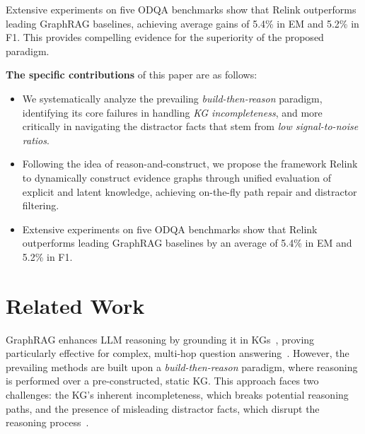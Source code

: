 \documentclass[letterpaper]{article} %
\begin{document}
Extensive experiments on five ODQA benchmarks show that Relink outperforms leading GraphRAG baselines, achieving average gains of 5.4\% in EM and 5.2\% in F1. This provides compelling evidence for the superiority of the proposed paradigm.



\smallskip\noindent
{\bf The specific contributions} of this paper are as follows:
\begin{itemize}
\item[1)] We systematically analyze the prevailing \textit{build-then-reason} paradigm, identifying its core failures in handling \textit{KG incompleteness}, and more critically in navigating the distractor facts that stem from \textit{low signal-to-noise ratios}.
\item[2)] Following the idea of reason-and-construct, we propose the framework Relink to dynamically construct evidence graphs through unified evaluation of explicit and latent knowledge, achieving on-the-fly path repair and distractor filtering.
\item[3)] Extensive experiments on five ODQA benchmarks show that Relink outperforms leading GraphRAG baselines by an average of 5.4\% in EM and 5.2\% in F1.
\end{itemize}

\section{Related Work}

GraphRAG enhances LLM reasoning by grounding it in KGs~\cite{roadmap,graph_review_2,DBLP:conf/www/ZhuoWWP025}, proving particularly effective for complex, multi-hop question answering~\cite{In-depth}. However, the prevailing methods are built upon a \textit{build-then-reason} paradigm, where reasoning is performed over a pre-constructed, static KG. This approach faces two challenges: the KG’s inherent incompleteness, which breaks potential reasoning paths, and the presence of misleading distractor facts, which disrupt the reasoning process~\cite{incomplete_of_kg,GiVE,IncompleteKG,GoG}.
\end{document}
